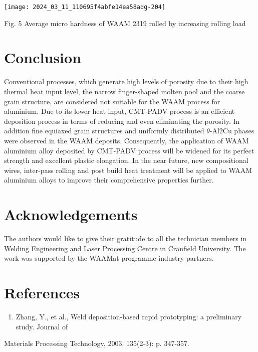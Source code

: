 \documentclass[10pt]{article}
\begin{document}
\begin{center}
\texttt{[image: 2024\_03\_11\_110695f4abfe14ea58adg-204]}
\end{center}

Fig. 5 Average micro hardness of WAAM 2319 rolled by increasing rolling load

\section*{Conclusion}
Conventional processes, which generate high levels of porosity due to their high thermal heat input level, the narrow finger-shaped molten pool and the coarse grain structure, are considered not suitable for the WAAM process for aluminium. Due to its lower heat input, CMT-PADV process is an efficient deposition process in terms of reducing and even eliminating the porosity. In addition fine equiaxed grain structures and uniformly distributed $\theta$-Al2Cu phases were observed in the WAAM deposits. Consequently, the application of WAAM aluminium alloy deposited by CMT-PADV process will be widened for its perfect strength and excellent plastic elongation. In the near future, new compositional wires, inter-pass rolling and post build heat treatment will be applied to WAAM aluminium alloys to improve their comprehensive properties further.

\section*{Acknowledgements}
The authors would like to give their gratitude to all the technician members in Welding Engineering and Laser Processing Centre in Cranfield University. The work was supported by the WAAMat programme industry partners.

\section*{References}
\begin{enumerate}
  \item Zhang, Y., et al., Weld deposition-based rapid prototyping: a preliminary study. Journal of
\end{enumerate}

Materials Processing Technology, 2003. 135(2-3): p. 347-357.
\end{document}
